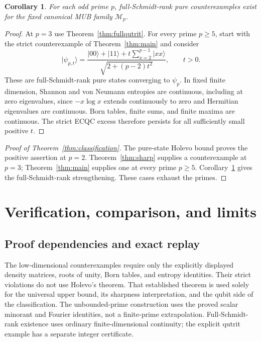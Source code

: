 \documentclass[11pt]{article}
\newtheorem{corollary}[theorem]{Corollary}
\theoremstyle{remark}
\newcommand{\M}{\mathcal M}
\newcommand{\ket}[1]{\lvert #1\rangle}
\begin{document}
\begin{corollary}\label{cor:robust}
For each odd prime $p$, full-Schmidt-rank pure counterexamples exist for the fixed canonical MUB family $\M_p$.
\end{corollary}
\begin{proof}
At $p=3$ use Theorem~\ref{thm:fullqutrit}. For every prime $p\geq5$, start with the strict counterexample of Theorem~\ref{thm:main} and consider
\[
 \ket{\psi_{p,t}}=
 \frac{\ket{00}+\ket{11}+t\sum_{x=2}^{p-1}\ket{xx}}
 {\sqrt{2+(p-2)t^2}},\qquad t>0.
\]
These are full-Schmidt-rank pure states converging to $\psi_p$. In fixed finite dimension, Shannon and von Neumann entropies are continuous, including at zero eigenvalues, since $-x\log x$ extends continuously to zero and Hermitian eigenvalues are continuous. Born tables, finite sums, and finite maxima are continuous. The strict ECQC excess therefore persists for all sufficiently small positive $t$.
\end{proof}

\begin{proof}[Proof of Theorem~\ref{thm:classification}]
The pure-state Holevo bound proves the positive assertion at $p=2$. Theorem~\ref{thm:sharp} supplies a counterexample at $p=3$; Theorem~\ref{thm:main} supplies one at every prime $p\geq5$. Corollary~\ref{cor:robust} gives the full-Schmidt-rank strengthening. These cases exhaust the primes.
\end{proof}

\section{Verification, comparison, and limits}\label{sec:verification}
\subsection{Proof dependencies and exact replay}
The low-dimensional counterexamples require only the explicitly displayed density matrices, roots of unity, Born tables, and entropy identities. Their strict violations do not use Holevo's theorem. That established theorem is used solely for the universal upper bound, its sharpness interpretation, and the qubit side of the classification. The unbounded-prime construction uses the proved scalar minorant and Fourier identities, not a finite-prime extrapolation. Full-Schmidt-rank existence uses ordinary finite-dimensional continuity; the explicit qutrit example has a separate integer certificate.
\end{document}
